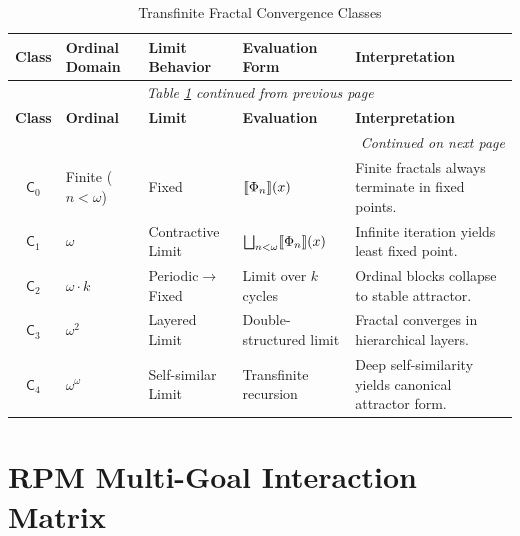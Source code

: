 \renewcommand{\arraystretch}{1.25}
\small
\begin{longtable}{c|p{2cm}|p{2cm}|p{2.5cm}|p{4.5cm}}
\caption{Transfinite Fractal Convergence Classes}
\label{tab:transfinite-convergence} \\
\toprule
\textbf{Class}
& \textbf{Ordinal Domain}
& \textbf{Limit Behavior}
& \textbf{Evaluation Form}
& \textbf{Interpretation}
\\
\midrule
\endfirsthead
\multicolumn{5}{c}{\textit{Table \ref{tab:transfinite-convergence} continued from previous page}} \\
\toprule
\textbf{Class}
& \textbf{Ordinal}
& \textbf{Limit}
& \textbf{Evaluation}
& \textbf{Interpretation}
\\
\midrule
\endhead
\midrule
\multicolumn{5}{r}{\textit{Continued on next page}} \\
\endfoot
\bottomrule
\endlastfoot

$\mathsf{C}_0$ & Finite ($n<\omega$) & Fixed & $\llbracket \Phi_n \rrbracket(x)$ &
Finite fractals always terminate in fixed points. \\

$\mathsf{C}_1$ & $\omega$ & Contractive Limit & $\bigsqcup_{n<\omega}\llbracket \Phi_n \rrbracket(x)$ &
Infinite iteration yields least fixed point. \\

$\mathsf{C}_2$ & $\omega \cdot k$ & Periodic$\to$Fixed & Limit over $k$ cycles &
Ordinal blocks collapse to stable attractor. \\

$\mathsf{C}_3$ & $\omega^2$ & Layered Limit & Double-structured limit &
Fractal converges in hierarchical layers. \\

$\mathsf{C}_4$ & $\omega^\omega$ & Self-similar Limit & Transfinite recursion &
Deep self-similarity yields canonical attractor form. \\

\end{longtable}
\normalsize

\section{RPM Multi-Goal Interaction Matrix}

